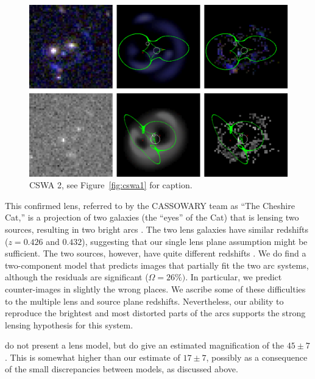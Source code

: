 \documentclass[iop]{emulateapj}
\begin{document}

\begin{figure}[!ht]
	\centering\includegraphics[width=\linewidth]{figs/2.eps}
	\caption{CSWA 2, see Figure~\ref{fig:cswa1} for caption.}
	\label{fig:cswa2}
\end{figure}

This confirmed lens, referred to by the CASSOWARY team as ``The Cheshire Cat,''
is a projection of two galaxies (the ``eyes'' of the Cat) that is lensing  two
sources, resulting in two bright arcs \citep{Bel++09}.  The two lens galaxies
have similar redshifts ($z=0.426$ and $0.432$), suggesting that our single lens
plane assumption might be sufficient.  The two sources, however, have quite
different redshifts \citep[$z=0.97$ and $z>1.4$][]{Bel++09}.  We do find a
two-component model that predicts images that partially fit the two arc systems,
although the residuals are significant ($\Omega = 26\%)$.  In particular, we
predict counter-images in slightly the wrong places. We ascribe some of these
difficulties to the multiple lens and source plane redshifts. Nevertheless, our
ability to reproduce the brightest and most distorted  parts of the arcs
supports the strong lensing hypothesis for this system.

\citeauthor{Bel++09} do not present a lens model, but do give an estimated
magnification of the $ 45 \pm 7$. This is somewhat higher than our estimate of
$17 \pm 7$, possibly as a consequence of the small discrepancies between models,
as discussed above.

\end{document}
